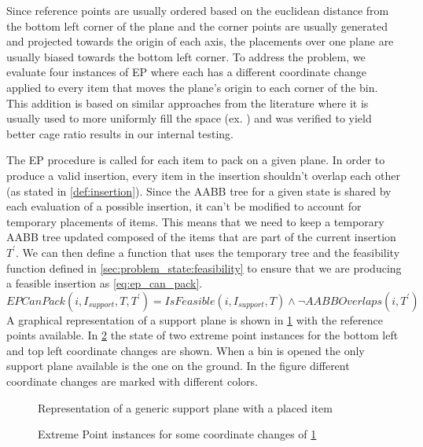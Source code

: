 Since reference points are usually ordered based on the euclidean distance from the bottom left corner of the plane and the corner points are usually generated and projected towards the origin of each axis, the placements over one plane are usually biased towards the bottom left corner.
To address the problem, we evaluate four instances of EP where each has a different coordinate change applied to every item that moves the plane's origin to each corner of the bin.
This addition is based on similar approaches from the literature where it is usually used to more uniformly fill the space (ex. \citeauthor{GAJDA2022102559}) and was verified to yield better cage ratio results in our internal testing.

The EP procedure is called for each item to pack on a given plane. 
In order to produce a valid insertion, every item in the insertion shouldn't overlap each other (as stated in \cref{def:insertion}).
Since the AABB tree for a given state is shared by each evaluation of a possible insertion, it can't be modified to account for temporary placements of items.
This means that we need to keep a temporary AABB tree updated composed of the items that are part of the current insertion $T^\prime$.
We can then define a function that uses the temporary tree and the feasibility function defined in \cref{sec:problem_state:feasibility} to ensure that we are producing a feasible insertion as \cref{eq:ep_can_pack}.
\begin{equation}
    \label{eq:ep_can_pack}
    EPCanPack(i, I_{support}, T, T^\prime) = IsFeasible(i, I_{support}, T) \land \lnot AABBOverlaps(i, T^\prime)
\end{equation}
A graphical representation of a support plane is shown in \cref{fig:support_planes} with the reference points available. In \cref{fig:ep_coordinate_changes} the state of two extreme point instances for the bottom left and top left coordinate changes are shown.
When a bin is opened the only support plane available is the one on the ground. 
In the figure different coordinate changes are marked with different colors.

\begin{figure}[hp]
    \centering
    \scalebox{0.9}{%
    
    }
    \caption{Representation of a generic support plane with a placed item}
    \label{fig:support_planes}
\end{figure}

\begin{figure}[hp]
    \centering
    
    \caption{Extreme Point instances for some coordinate changes of \cref{fig:support_planes}}
    \label{fig:ep_coordinate_changes}
\end{figure}


